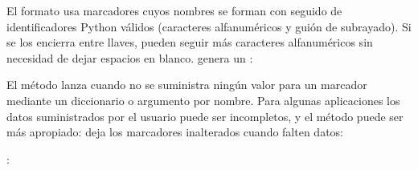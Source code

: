\documentclass[a5paper,10pt,spanish]{sphinxmanual}
\begin{document}
\sphinxAtStartPar
El formato usa marcadores cuyos nombres se forman con \sphinxcode{\sphinxupquote{\$}} seguido de identificadores Python válidos (caracteres alfanuméricos y guión de subrayado). Si se los encierra entre llaves, pueden seguir más caracteres alfanuméricos sin necesidad de dejar espacios en blanco. \sphinxcode{\sphinxupquote{\$\$}} genera un \sphinxcode{\sphinxupquote{\$}}:

\begin{sphinxVerbatim}[commandchars=\\\{\}]
   
  
 
\end{sphinxVerbatim}

\sphinxAtStartPar
El método  lanza  cuando no se suministra ningún valor para un marcador mediante un diccionario o argumento por nombre.  Para algunas aplicaciones los datos suministrados por el usuario puede ser incompletos, y el método  puede ser más apropiado: deja los marcadores inalterados cuando falten datos:

\begin{sphinxVerbatim}[commandchars=\\\{\}]
  
  
: 
\end{sphinxVerbatim}
\end{document}
